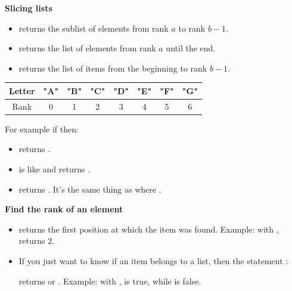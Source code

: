 \documentclass[11pt,class=report,crop=false]{standalone}
\begin{document}
\bigskip
    
\textbf{Slicing lists}
  
  \begin{itemize}
    \item {} \quad returns the sublist of elements from rank $a$ to rank $b-1$.
    
    \item {} \quad returns the list of elements from rank $a$ until the end.
      
    \item {} \quad returns the list of items from the beginning to rank $b-1$.
    

\end{itemize}


\medskip
 \begin{center}
\begin{tabular}{|c|||c|c|c|c|c|c|c|}
\hline
Letter & \textbf{"A"} & \textbf{"B"} & \textbf{"C"} & \textbf{"D"} & \textbf{"E"} & \textbf{"F"} & \textbf{"G"} \\ \hline
Rank & 0 & 1 & 2 & 3 & 4 & 5 & 6 \\ \hline
\end{tabular}
\end{center}
\medskip
  
    For example if  then:
  \begin{itemize}
    \item {} \quad returns \ci{["B","C","D"]}.
    \item {} \quad is like  and returns \ci{["A","B"]}.   
    \item {} \quad returns \ci{["E","F","G"]}.  It's the same thing 
     as  where .
  \end{itemize} 

\bigskip

\textbf{Find the rank of an element} 

\begin{itemize}

    \item   
    returns the first position at which the item was found. Example: with ,
    returns $2$.

  \item If you just want to know if an item belongs to a list, then the statement :  
  
  returns  or .
  Example: with ,
   \og{}\fg{} is true, while \og{}\fg{} is false.
  
\end{itemize}
\end{document}

